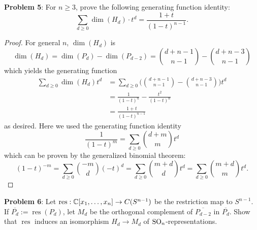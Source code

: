 \documentclass{amsart}
\DeclareMathOperator{\res}{res}
\begin{document}
	\newpage 
	\noindent \textbf{Problem 5}: For $n\geq 3$, prove the following generating function identity:
	$$
	\sum_{d\geq 0} \dim (H_d) \cdot t^d = \frac{1+t}{(1-t)^{n-1}}.
	$$
	\begin{proof}
		For general $n$, $\dim(H_d)$ is 
		$$
		\dim(H_d) = \dim(P_d) - \dim(P_{d-2}) = {d+n-1 \choose n-1} - {d + n - 3 \choose n - 1}
		$$
		which yields the generating function
		\begin{align*}
			\sum_{d\geq 0} \dim(H_d) t^d &= \sum_{d\geq 0} \bigg({d+n-1 \choose n-1} - {d + n - 3 \choose n - 1}\bigg) t^d\\
			&= \frac{1}{(1-t)^{n}} - \frac{t^2}{(1-t)^{n}} \\
			&= \frac{1+t}{(1-t)^{n-1}}
		\end{align*}
		as desired. Here we used the generating function identity
		$$
		\frac{1}{(1-t)^m} = \sum_{d\geq 0} {d + m \choose m} t^d
		$$
		which can be proven by the generalized binomial theorem:
		$$
		(1-t)^{-m} = \sum_{d\geq 0}{-m\choose d} (-t)^d = \sum_{d\geq 0} {m+d \choose d} t^d = \sum_{d\geq 0} {m+d \choose m} t^d.
		$$
	\end{proof}
	
	\newpage
	\noindent \textbf{Problem 6}: Let $\res:\C[x_1,\dots,x_n]\to C(S^{n-1})$ be the restriction map to $S^{n-1}$. If $\overline{P_d}:=\res(P_d)$, let $M_d$ be the orthogonal complement of $\overline{P_{d-2}}$ in $\overline{P_{d}}$. Show that $\res$ induces an isomorphism $H_d\to M_d$ of $\operatorname{SO}_n$-representations.
	
\end{document}
